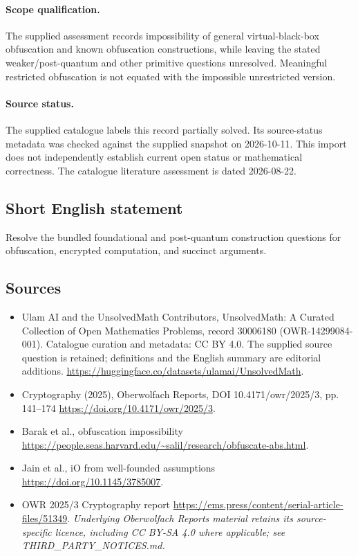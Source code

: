 \documentclass[11pt]{article}
\begin{document}
\paragraph{Scope qualification.}
The supplied assessment records impossibility of general virtual-black-box obfuscation and known obfuscation constructions, while leaving the stated weaker/post-quantum and other primitive questions unresolved. Meaningful restricted obfuscation is not equated with the impossible unrestricted version.
\paragraph{Source status.}
The supplied catalogue labels this record partially solved. Its source-status metadata was checked against the supplied snapshot on 2026-10-11. This import does not independently establish current open status or mathematical correctness. The catalogue literature assessment is dated 2026-08-22.
\subsection{Short English statement}
Resolve the bundled foundational and post-quantum construction questions for obfuscation, encrypted computation, and succinct arguments.
\subsection{Sources}
\begin{itemize}
\item[\hypertarget{source:30006180:1}{S1}] Ulam AI and the UnsolvedMath Contributors, UnsolvedMath: A Curated Collection of Open Mathematics Problems, record 30006180 (OWR-14299084-001). Catalogue curation and metadata: CC BY 4.0. The supplied source question is retained; definitions and the English summary are editorial additions.
\url{https://huggingface.co/datasets/ulamai/UnsolvedMath}.
\item[\hypertarget{source:30006180:2}{S2}] Cryptography (2025), Oberwolfach Reports, DOI 10.4171/owr/2025/3, pp. 141--174
\url{https://doi.org/10.4171/owr/2025/3}.
\item[\hypertarget{source:30006180:3}{S3}] Barak et al., obfuscation impossibility
\url{https://people.seas.harvard.edu/~salil/research/obfuscate-abs.html}.
\item[\hypertarget{source:30006180:4}{S4}] Jain et al., iO from well-founded assumptions
\url{https://doi.org/10.1145/3785007}.
\item[\hypertarget{source:30006180:5}{S5}] OWR 2025/3 Cryptography report
\url{https://ems.press/content/serial-article-files/51349}.
\textit{Underlying Oberwolfach Reports material retains its source-specific licence, including CC BY-SA 4.0 where applicable; see THIRD\_PARTY\_NOTICES.md.}
\end{itemize}
\end{document}
